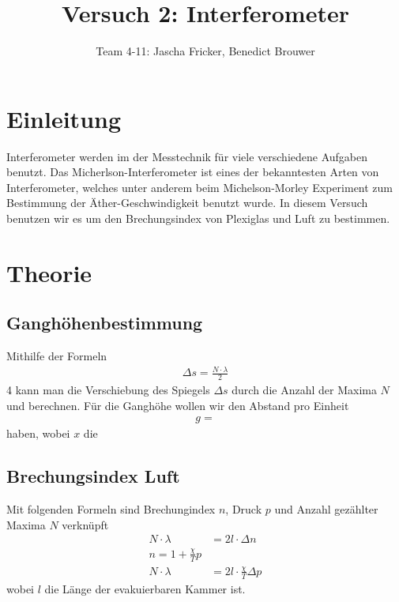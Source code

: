 \documentclass[11pt, a4paper]{article}
\title{Versuch 2: Interferometer}
\author{Team 4-11: Jascha Fricker, Benedict Brouwer}
\begin{document}
    \maketitle

    \tableofcontents

    \newpage

    \section{Einleitung}

    Interferometer werden im der Messtechnik für viele verschiedene Aufgaben benutzt. Das Micherlson-Interferometer ist eines der bekanntesten Arten von Interferometer, welches unter anderem beim Michelson-Morley Experiment zum Bestimmung der Äther-Geschwindigkeit benutzt wurde. In diesem Versuch benutzen wir es um den Brechungsindex von Plexiglas und Luft zu bestimmen.

    \section{Theorie}
    \subsection{Ganghöhenbestimmung}

    Mithilfe der Formeln
    \begin{align}
        \Delta s = \frac{N \cdot \lambda}{2}
    \end{align}4
    kann man die Verschiebung des Spiegels $\Delta s$ durch die Anzahl der Maxima $N$ und berechnen. Für die Ganghöhe wollen wir den Abstand pro Einheit
    \begin{align}
        g =
    \end{align}
    haben, wobei $x$ die 

    \subsection{Brechungsindex Luft}
    Mit folgenden Formeln sind Brechungindex $n$, Druck $p$ und Anzahl gezählter Maxima $N$ verknüpft
    \begin{align}
        N \cdot \lambda &= 2 l \cdot \Delta n \\
        n = 1 + \frac{\chi}{T} p \\
        N \cdot \lambda &= 2 l \cdot \frac{\chi}{T} \Delta p
    \end{align}
    wobei $l$ die Länge der evakuierbaren Kammer ist.
\end{document}
